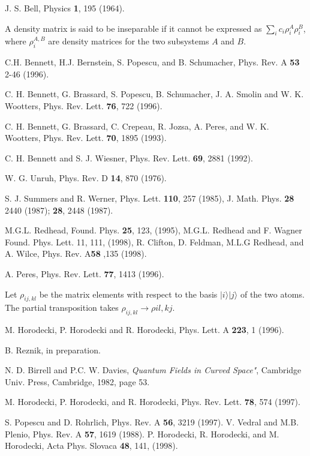 \documentclass[12pt]{article}
\def \ra {\rangle}
\begin{document}
\begin{thebibliography}{999}

 J. S. Bell,  Physics {\bf 1}, 195 (1964).

 A density matrix is said to be inseparable if it cannot be
expressed as  $\sum_i c_i\rho_i^A\rho_i^B$,
where $\rho_i^{A,B}$ are density matrices for the two subsystems $A$ and $B$.


 C.H. Bennett, H.J. Bernstein, S. Popescu,
and B.  Schumacher, Phys. Rev. A {\bf 53} 2-46 (1996).


 C. H. Bennett, G. Brassard, S. Popescu,
B. Schumacher, J. A. Smolin and W. K. Wootters, Phys. Rev. Lett. {\bf 76},
722 (1996).

 C. H. Bennett, G. Brassard, C. Crepeau, R. Jozsa,
A. Peres, and W. K. Wootters, Phys. Rev. Lett. {\bf 70}, 1895 (1993).

 C. H. Bennett and S. J. Wiesner, Phys. Rev.
Lett. {\bf 69}, 2881 (1992).



 W. G. Unruh, Phys. Rev. D {\bf 14}, 870 (1976).

 S. J. Summers and R. Werner, Phys. Lett. {\bf 110},
257 (1985),  J. Math. Phys. {\bf 28}
2440 (1987); {\bf 28}, 2448 (1987).


 M.G.L. Redhead, Found. Phys. {\bf 25}, 123, (1995),
   M.G.L. Redhead and F. Wagner
   Found. Phys. Lett. {\bf} 11, 111,  (1998),
   R. Clifton, D. Feldman, M.L.G Redhead, and A. Wilce,
   Phys. Rev.  A{\bf 58} ,135  (1998).

 A. Peres, Phys. Rev. Lett. {\bf 77}, 1413 (1996).

 Let $\rho_{ij,kl}$ be the matrix
elements  with respect to the basis $|i\ra|j\ra$
of the two atoms.
The partial transposition takes
$\rho_{ij,kl}\to \rho{il,kj}$.



 M. Horodecki, P. Horodecki and R. Horodecki, Phys. Lett. A {\bf
223}, 1 (1996).


 B. Reznik, in preparation.

 N. D. Birrell and P.C. W. Davies,
{\em Quantum Fields in Curved Space"}, Cambridge Univ. Press, Cambridge,
1982, page 53.

 M. Horodecki, P. Horodecki, and R. Horodecki, Phys. Rev.
Lett. {\bf 78}, 574 (1997).


 S. Popescu and D. Rohrlich, Phys. Rev. {A} {\bf 56},
3219 (1997).
 V. Vedral and M.B. Plenio, Phys. Rev. A {\bf 57}, 1619 (1988).
P. Horodecki, R. Horodecki, and M. Horodecki,
    Acta  Phys. Slovaca {\bf 48}, 141, (1998).

\end{thebibliography}
\end{document}
